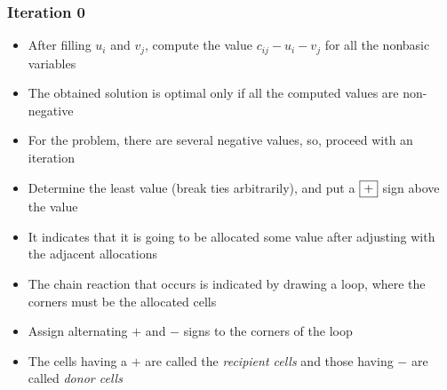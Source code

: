 \documentclass{beamer}
\newcommand\circled[3]{\node(#1)[text width=.45cm,circle,draw,right of=#2,inner sep=0pt]{\tiny #3};}
\begin{document}
\begin{frame}[fragile]
\begin{textblock*}{5cm}
\end{textblock*}
\end{frame}

\begin{frame}
\frametitle{Iteration 0}
    \begin{itemize}
  \item After filling $u_i$ and $v_j$, compute the value $c_{ij}-u_i-v_j$ for all the nonbasic variables
  \item The obtained solution is optimal only if all the computed values are non-negative
  \item For the problem, there are several negative values, so, proceed with an iteration
  \item Determine the least value (break ties arbitrarily), and put a $\fbox{+}$ sign above the value
  \item It indicates that it is going to be allocated some value after adjusting with the adjacent allocations
  \item The chain reaction that occurs is indicated by drawing a loop, where the corners must be the allocated cells
  \item Assign alternating $+$ and $-$ signs to the corners of the loop
  \item The cells having a $+$ are called the \textit{recipient cells} and those having $-$ are called \textit{donor cells}
  \end{itemize}
\end{frame}
\end{document}
